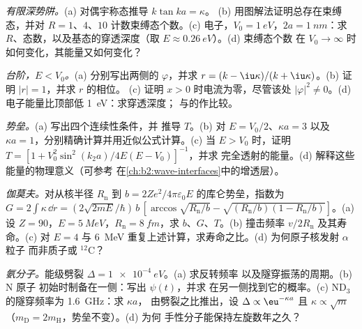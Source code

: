 \begin{exercise}[$\star\star$]\label{exo:b2:potential-wells-tunneling:6}
\emph{有限深势阱。}(a) 对偶宇称态推导 $k\tan ka = \kappa$。
(b) 用图解法证明总存在束缚态，并对
$R = 1$、$4$、$10$ 计数束缚态个数。(c) 电子，$V_0 = \qty{1}{eV}$，$2a = \qty{1}{nm}$：求
$R$、态数，以及基态的穿透深度（取
$E \approx \qty{0.26}{eV}$）。(d) 束缚态个数
在 $V_0 \to \infty$ 时如何变化，其能量又如何变化？
\end{exercise}

\begin{exercise}[$\star\star$]\label{exo:b2:potential-wells-tunneling:7}
\emph{台阶，$E < V_0$。}(a) 分别写出两侧的 $\varphi$，并求 $r =
(k - \iu\kappa)/(k + \iu\kappa)$。(b) 证明 $|r| = 1$，并求 $r$ 的相位。
(c) 证明 $x > 0$ 时电流为零，尽管该处 $|\varphi|^2 \ne
0$。(d) 电子能量比顶部低 \qty{1}{eV}：求穿透深度；
与的作比较。
\end{exercise}

\begin{exercise}[$\star\star$]\label{exo:b2:potential-wells-tunneling:8}
\emph{势垒。}(a) 写出四个连续性条件，并
推导 $T$。(b) 对 $E =
V_0/2$、$\kappa a = 3$ 以及 $\kappa a = 1$，分别精确计算并用近似公式计算。(c) 当 $E > V_0$ 时，证明 $T = [1 +
V_0^2\sin^2(k_2a)/4E(E - V_0)]^{-1}$，并求
完全透射的能量。(d) 解释这些能量的物理意义（可参考
在\cref{ch:b2:wave-interfaces}中的增透层）。
\end{exercise}

\begin{exercise}[$\star\star$]\label{exo:b2:potential-wells-tunneling:9}
\emph{伽莫夫。}对从核半径 $R_{\text{n}}$
到 $b = 2Ze^2/4\pi\varepsilon_0E$ 的库仑势垒，指数为 $G = 2\int\kappa\,\dd r =
(2\sqrt{2mE}/\hbar)\,b\,[\arccos\sqrt{R_{\text{n}}/b} - \sqrt{(R_{\text{n}}/b)(1 -
R_{\text{n}}/b)}]$。(a) 设 $Z = 90$，$E = \qty{5}{MeV}$，$R_{\text{n}} = \qty{8}{fm}$，求
$b$、$G$、$T$。(b) 撞击频率 $v/2R_{\text{n}}$ 及其寿命。(c)
对 $E = 4$ 与 \qty{6}{MeV} 重复上述计算，求寿命之比。(d) 为何原子核发射 $\alpha$ 粒子
而非质子或 $^{12}$C？
\end{exercise}

\begin{exercise}[$\star\star\star$]\label{exo:b2:potential-wells-tunneling:10}
\emph{氨分子。}能级劈裂 $\Delta = \qty{1e-4}{eV}$。(a) 求反转频率
以及隧穿振荡的周期。(b) N 原子
初始时制备在一侧：写出 $\psi(t)$，并求
在另一侧找到它的概率。(c) ND$_3$ 的隧穿频率为 \qty{1.6}{GHz}：求 $\kappa a$，
由劈裂之比推出，设 $\Delta \propto \eu^{-\kappa a}$ 且 $\kappa
\propto\sqrt m$（$m_{\text{D}} = 2m_{\text{H}}$，势垒不变）。(d) 为何
手性分子能保持左旋数年之久？
\end{exercise}

